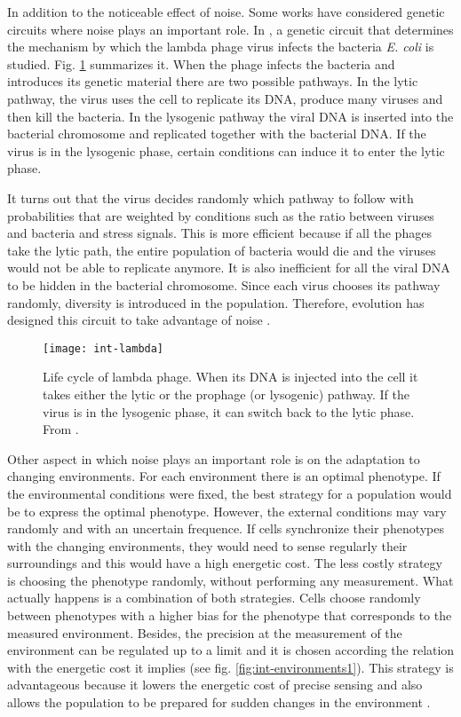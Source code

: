 In addition to the noticeable effect of noise. Some works have considered genetic circuits where noise plays an important role. In \cite{arkin98}, a genetic circuit that determines the mechanism by which the lambda phage virus infects the bacteria \textit{E. coli} is studied. Fig. \ref{fig:int-lambda} summarizes it. When the phage infects the bacteria and introduces its genetic material there are two possible pathways. In the lytic pathway, the virus uses the cell to replicate its DNA, produce many viruses and then kill the bacteria. In the lysogenic pathway the viral DNA is inserted into the bacterial chromosome and replicated together with the bacterial DNA. If the virus is in the lysogenic phase, certain conditions can induce it to enter the lytic phase.

It turns out that the virus decides randomly which pathway to follow with probabilities that are weighted by conditions such as the ratio between viruses and bacteria and stress signals. This is more efficient because if all the phages take the lytic path, the entire population of bacteria would die and the viruses would not be able to replicate anymore. It is also inefficient for all the viral DNA to be hidden in the bacterial chromosome. Since each virus chooses its pathway randomly, diversity is introduced in the population. Therefore, evolution has designed this circuit to take advantage of noise \cite{arkin98}.

\begin{figure}[H]
  \centering
  \texttt{[image: int-lambda]}
  \caption[Life cycle of lambda phage]{\label{fig:int-lambda} Life cycle of lambda phage. When its DNA is injected into the cell it takes either the lytic or the prophage (or lysogenic) pathway. If the virus is in the lysogenic phase, it can switch back to the lytic phase. From \cite{alberts08}.}
\end{figure}

Other aspect in which noise plays an important role is on the adaptation to changing environments. For each environment there is an optimal phenotype. If the environmental conditions were fixed, the best strategy for a population would be to express the optimal phenotype. However, the external conditions may vary randomly and with an uncertain frequence. If cells synchronize their phenotypes with the changing environments, they would need to sense regularly their surroundings and this would have a high energetic cost. The less costly strategy is choosing the phenotype randomly, without performing any measurement. What actually happens is a combination of both strategies. Cells choose randomly between phenotypes with a higher bias for the phenotype that corresponds to the measured environment. Besides, the precision at the measurement of the environment can be regulated up to a limit and it is chosen according the relation with the energetic cost it implies (see fig. \ref{fig:int-environments1}). This strategy is advantageous because it lowers the energetic cost of precise sensing and also allows the population to be prepared for sudden changes in the environment \cite{kussell05}.


